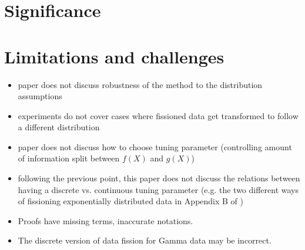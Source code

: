 \section{Significance}

\section{Limitations and challenges}

\begin{itemize}
\item paper does not discuss robustness of the method to the distribution assumptions
\item experiments do not cover cases where fissioned data get transformed to follow a different distribution
\item paper does not discuss how to choose tuning parameter (controlling amount of information split between $f(X)$ and $g(X)$)
\item following the previous point, this paper does not discuss the relations between having a discrete vs. continuous tuning parameter (e.g. the two different ways of fissioning exponentially distributed data in Appendix B of \cite{leiner2022data})
\item Proofs have missing terms, inaccurate notations.
\item The discrete version of data fission for Gamma data may be incorrect.
\end{itemize}
